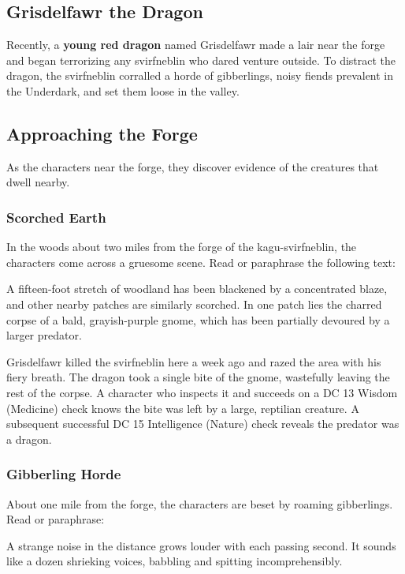 \documentclass[10pt,a4paper,twoside,bg=print,twocolumn,openany,nodeprecatedcode]{dndbook}
\begin{document}
\subsection{Grisdelfawr the Dragon}
Recently, a \textbf{young red dragon} named Grisdelfawr made a lair near the forge and began terrorizing any svirfneblin who dared venture outside. To distract the dragon, the svirfneblin corralled a horde of gibberlings, noisy fiends prevalent in the Underdark, and set them loose in the valley.

\subsection{Approaching the Forge}
As the characters near the forge, they discover evidence of the creatures that dwell nearby.

\subsubsection{Scorched Earth}
In the woods about two miles from the forge of the kagu-svirfneblin, the characters come across a gruesome scene. Read or paraphrase the following text:

\begin{DndReadAloud}{}
A fifteen-foot stretch of woodland has been blackened by a concentrated blaze, and other nearby patches are similarly scorched. In one patch lies the charred corpse of a bald, grayish-purple gnome, which has been partially devoured by a larger predator.

\end{DndReadAloud}

Grisdelfawr killed the svirfneblin here a week ago and razed the area with his fiery breath. The dragon took a single bite of the gnome, wastefully leaving the rest of the corpse. A character who inspects it and succeeds on a DC 13 Wisdom (Medicine) check knows the bite was left by a large, reptilian creature. A subsequent successful DC 15 Intelligence (Nature) check reveals the predator was a dragon.

\subsubsection{Gibberling Horde}
About one mile from the forge, the characters are beset by roaming gibberlings. Read or paraphrase:

\begin{DndReadAloud}{}
A strange noise in the distance grows louder with each passing second. It sounds like a dozen shrieking voices, babbling and spitting incomprehensibly.

\end{DndReadAloud}
\end{document}
